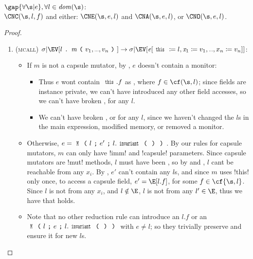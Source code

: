 \begin{theorem}\rm
$\gap{\forall \s|e},\forall l \in \mathit{dom}(\s)$:\\
\indent $\CNC(\s, l, f)$ and either:
\qindent $\CNE(\s, e, l)$ and $\CNA(\s, e, l)$, or
\qindent $\CNO(\s, e, l)$.
\end{theorem}
\begin{proof}
\SS\begin{enumerate}

\item (\textsc{mcall}) $\sigma|\EV[l\singleDot\m\oR v_1,\ldots,v_n\cR]\rightarrow \sigma|\EV[\e[\Kw{this}\coloneqq l,\x_1\coloneqq v_1,\ldots,x_n\coloneqq v_n]]$:
\begin{itemize}
\item If $m$ is not a capsule mutator, by , $e$ doesn't contain a monitor:
\begin{itemize}
		\item Thus $e$ wont contain $\Kw{this}.f$ as \muty, where $f \in \cf(\s, l)$; since fields are instance private, we can't have introduced any other field accesses, so we can't have broken \CNA, for any $l$.
		\item We can't have broken \CNC, \CNE or \CNO for any $l$, since we haven't changed the $l$s in the main expression, modified memory, or removed a monitor.
\end{itemize}
\item Otherwise, $e = \M{l}{e'}{l.\invariant}$. By our rules for capsule mutators, $m$ can only have \Q!imm! and \Q!capsule! parameters. Since capsule mutators are \Q!mut! methods, $l$ must have been \muty, so by  and , $l$ cant be reachable from any $x_i$. By , $e'$ can't contain any $l$s, and since $m$ uses \Q!this! only once, to access a capsule field, $e' = \E[l.f]$, for some $f \in \cf{\s, l}$. Since $l$ is not \reach from any $x_i$, and $l \notin \E$, $l$ is not \reach from any $l' \in \E$, thus we have that \CNO holds.
\item Note that no other reduction rule can introduce an $l.f$ or an $\M{l}{e}{l.\invariant}$ with $e \neq l$; so they trivially preserve \CNA and ensure it for new $l$s.
\end{itemize}


\end{enumerate}
\end{proof}
